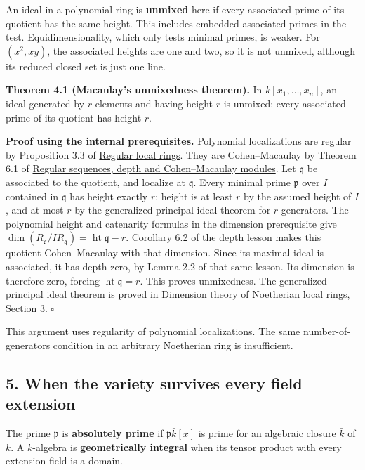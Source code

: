 \documentclass[
]{article}
\begin{document}
An ideal in a polynomial ring is \textbf{unmixed} here if every
associated prime of its quotient has the same height. This includes
embedded associated primes in the test. Equidimensionality, which only
tests minimal primes, is weaker. For \((x^2,xy)\), the associated
heights are one and two, so it is not unmixed, although its reduced
closed set is just one line.

\textbf{Theorem 4.1 (Macaulay's unmixedness theorem).} In
\(k[x_1,\ldots,x_n]\), an ideal generated by \(r\) elements and having
height \(r\) is unmixed: every associated prime of its quotient has
height \(r\).

\textbf{Proof using the internal prerequisites.} Polynomial
localizations are regular by Proposition 3.3 of
\href{../prerequisites/AG-CA/AG-CA-14.html}{Regular local rings}. They
are Cohen--Macaulay by Theorem 6.1 of
\href{../prerequisites/AG-CA/AG-CA-12.html}{Regular sequences, depth and
Cohen--Macaulay modules}. Let \(\mathfrak q\) be associated to the
quotient, and localize at \(\mathfrak q\). Every minimal prime
\(\mathfrak p\) over \(I\) contained in \(\mathfrak q\) has height
exactly \(r\): height is at least \(r\) by the assumed height of \(I\),
and at most \(r\) by the generalized principal ideal theorem for \(r\)
generators. The polynomial height and catenarity formulas in the
dimension prerequisite give
\(\dim (R_{\mathfrak q}/IR_{\mathfrak q})=\operatorname{ht}\mathfrak q-r\).
Corollary 6.2 of the depth lesson makes this quotient Cohen--Macaulay
with that dimension. Since its maximal ideal is associated, it has depth
zero, by Lemma 2.2 of that same lesson. Its dimension is therefore zero,
forcing \(\operatorname{ht}\mathfrak q=r\). This proves unmixedness. The
generalized principal ideal theorem is proved in
\href{../prerequisites/AG-CA/AG-CA-11.html}{Dimension theory of
Noetherian local rings}, Section 3. \(\square\)

This argument uses regularity of polynomial localizations. The same
number-of-generators condition in an arbitrary Noetherian ring is
insufficient.

\subsection{5. When the variety survives every field
extension}\label{when-the-variety-survives-every-field-extension}

The prime \(\mathfrak p\) is \textbf{absolutely prime} if
\(\mathfrak p\bar k[x]\) is prime for an algebraic closure \(\bar k\) of
\(k\). A \(k\)-algebra is \textbf{geometrically integral} when its
tensor product with every extension field is a domain.
\end{document}
